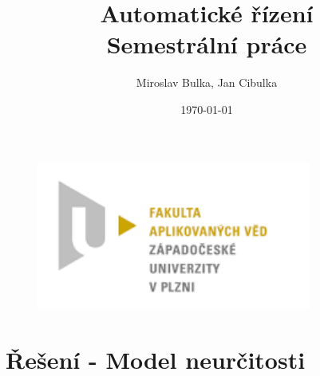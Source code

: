 \documentclass[a4paper,11pt]{article}
\title{Automatické řízení \\
	Semestrální práce}
\author{Miroslav Bulka, Jan Cibulka}
\date{\today}
\begin{document}
\maketitle

\begin{figure}[h]
	\centering
	\includegraphics[width=9cm]{obrazky/fav.png}
\end{figure}
\clearpage
\newpage



\newpage

\newpage

\tableofcontents
\newpage
\section{Řešení - Model neurčitosti}
\end{document}

